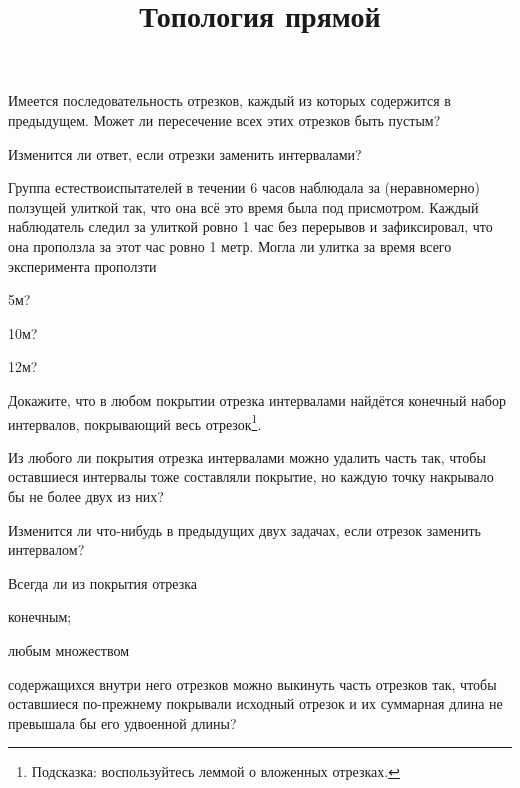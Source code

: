 \documentclass[a4paper, 12pt, num=27]{listok}
\begin{document}
\title{Топология прямой}
\maketitle{}
\begin{problem}\label{subsec}
	Имеется последовательность отрезков, каждый из которых содержится в предыдущем.
	Может ли пересечение всех этих отрезков быть пустым?
\end{problem}
\begin{problem}
	Изменится ли ответ, если отрезки заменить интервалами?
\end{problem}
\begin{problem}
	Группа естествоиспытателей в течении 6 часов наблюдала за (неравномерно) ползущей улиткой так,
	что она всё это время была под присмотром.
	Каждый наблюдатель следил за улиткой ровно 1 час без перерывов и зафиксировал, что она проползла за этот
	час ровно 1 метр. Могла ли улитка за время всего эксперимента проползти
	\begin{probparts}
		\item 5м?
		\item 10м?
		\item 12м?
	\end{probparts}
\end{problem}
\begin{problem}\label{coversec}
	Докажите, что в любом покрытии отрезка интервалами найдётся конечный набор интервалов, покрывающий весь отрезок\footnote{%
		Подсказка: воспользуйтесь леммой о вложенных отрезках.
	}.
\end{problem}
\begin{problem}
	Из любого ли покрытия отрезка интервалами можно удалить часть так, чтобы оставшиеся интервалы тоже составляли покрытие,
	но каждую точку накрывало бы не более двух из них?
\end{problem}
\begin{problem}
	Изменится ли что-нибудь в предыдущих двух задачах, если отрезок заменить интервалом?
\end{problem}
\begin{problem}
	Всегда ли из покрытия отрезка 
	\begin{probparts}
		\item конечным;
		\item любым множеством
	\end{probparts}
	содержащихся внутри него отрезков можно выкинуть часть отрезков так,
	чтобы оставшиеся по-прежнему покрывали исходный отрезок и их суммарная длина не превышала бы его удвоенной длины?
\end{problem}
\end{document}
